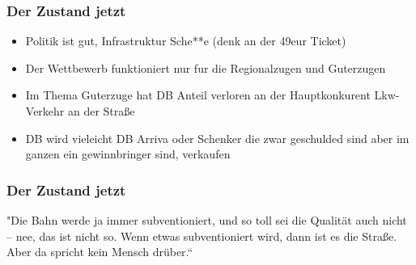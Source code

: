 \begin{frame}
\frametitle{Der Zustand jetzt}
\begin{itemize}
	\item Politik ist gut, Infrastruktur Sche**e (denk an der 49eur Ticket)
	\item Der Wettbewerb funktioniert nur fur die Regionalzugen und Guterzugen
	\item Im Thema Guterzuge hat DB Anteil verloren an der Hauptkonkurent Lkw-Verkehr an der Straße
	\item DB wird vieleicht DB Arriva oder Schenker die zwar geschulded sind aber im ganzen ein gewinnbringer sind, verkaufen
\end{itemize}
\end{frame}
\begin{frame}
\frametitle{Der Zustand jetzt}
	\centering
	\Large "Die Bahn werde ja immer subventioniert, und so toll sei die Qualität auch nicht – nee, das ist nicht so. Wenn etwas subventioniert wird, dann ist es die Straße. Aber da spricht kein Mensch drüber.“


\end{frame}
